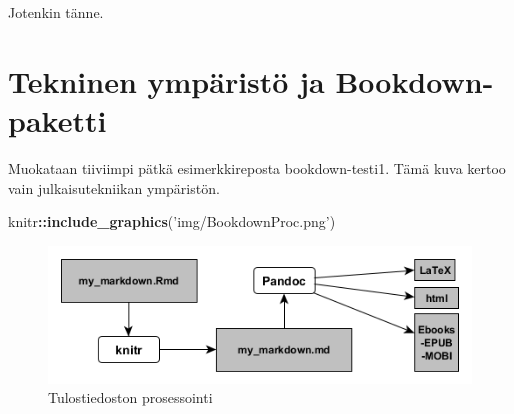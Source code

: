 \documentclass[
  finnish,
]{book}
\newenvironment{Shaded}{\begin{snugshade}}{\end{snugshade}}
\newcommand{\KeywordTok}[1]{\textcolor[rgb]{0.13,0.29,0.53}{\textbf{#1}}}
\newcommand{\NormalTok}[1]{#1}
\newcommand{\OperatorTok}[1]{\textcolor[rgb]{0.81,0.36,0.00}{\textbf{#1}}}
\newcommand{\StringTok}[1]{\textcolor[rgb]{0.31,0.60,0.02}{#1}}
\begin{document}
Jotenkin tänne.

\hypertarget{tekninen-ympuxe4ristuxf6-ja-bookdown-paketti}{%
\section{Tekninen ympäristö ja Bookdown-paketti}\label{tekninen-ympuxe4ristuxf6-ja-bookdown-paketti}}

Muokataan tiiviimpi pätkä esimerkkireposta bookdown-testi1. Tämä kuva kertoo vain
julkaisutekniikan ympäristön.

\begin{Shaded}
\begin{Highlighting}[]
\NormalTok{knitr}\OperatorTok{::}\KeywordTok{include_graphics}\NormalTok{(}\StringTok{'img/BookdownProc.png'}\NormalTok{)}
\end{Highlighting}
\end{Shaded}

\begin{figure}

{\centering \includegraphics[width=0.6\linewidth]{img/BookdownProc} 

}

\caption{Tulostiedoston prosessointi}\label{fig:L3bdprocess1}
\end{figure}

\backmatter
  
\end{document}
